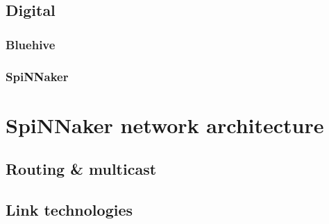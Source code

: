 			
		\subsection{Digital}
			
			
			\subsubsection{Bluehive}
				
			
			\subsubsection{SpiNNaker}
				
	
	
	\section{SpiNNaker network architecture}
		\label{sec:spinnaker}
		
		
		\subsection{Routing \& multicast}
			
		
		\subsection{Link technologies}
			
	

